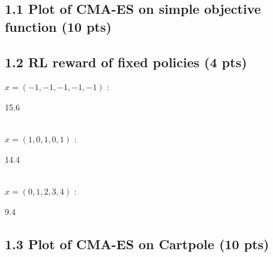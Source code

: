 \documentclass[12pt]{article}
\begin{document}
\subsection*{1.1 Plot of CMA-ES on simple objective function (10 pts)}
\begin{tcolorbox}[fit,height=30em, width=40em, blank, borderline={1pt}{1pt},nobeforeafter]
            \begin{center}
            \begin{solution}

            \end{solution}
            \end{center}
            \end{tcolorbox}
            
\subsection*{1.2 RL reward of fixed policies (4 pts)}

$x = (-1, -1, -1, -1, -1)$ : \begin{tcolorbox}[fit,height=1cm, width=5cm, blank, borderline={1pt}{1pt},nobeforeafter]
    \begin{center}
    \vspace{3mm}
    \large{15.6}
    \end{center}
\end{tcolorbox} \\
$x = (1, 0, 1, 0, 1)$ : \hspace{3.5em} \begin{tcolorbox}[fit,height=1cm, width=5cm, blank, borderline={1pt}{1pt},nobeforeafter]
    \begin{center}
    \vspace{3mm}
    \large{14.4}
    \end{center}
\end{tcolorbox} \\
$x = (0, 1, 2, 3, 4)$ : \hspace{3.5em} \begin{tcolorbox}[fit,height=1cm, width=5cm, blank, borderline={1pt}{1pt},nobeforeafter]
    \begin{center}
    \vspace{3mm}
    \large{9.4}
    \end{center}
\end{tcolorbox}

\subsection*{1.3 Plot of CMA-ES on Cartpole (10 pts)}
\begin{tcolorbox}[fit,height=30em, width=40em, blank, borderline={1pt}{1pt},nobeforeafter]
    \begin{center}
    \begin{solution}

    \end{solution}
    \end{center}
    \end{tcolorbox}
    
\end{document}
